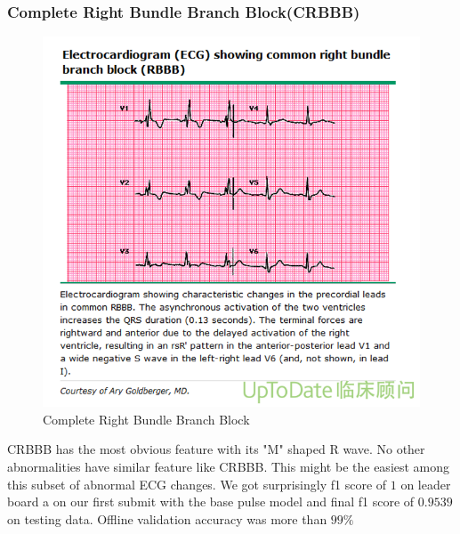 \documentclass[runningheads]{llncs}
\begin{document}
\subsubsection{Complete Right Bundle Branch Block(CRBBB)}
\begin{figure}[H]
	\includegraphics[width=\linewidth]{img/RBBB.png}
	\caption{\label{fig:RBBB} Complete Right Bundle Branch Block \cite{UptoDate}}
\end{figure}
CRBBB has the most obvious feature with its "M" shaped R wave. No other abnormalities have similar feature like CRBBB. This might be the easiest among this subset of abnormal ECG changes. We got surprisingly f1 score of $1$ on leader board a on our first submit with the base pulse model and final f1 score of $0.9539$ on testing data. Offline validation accuracy was more than $99\%$ 
\end{document}
